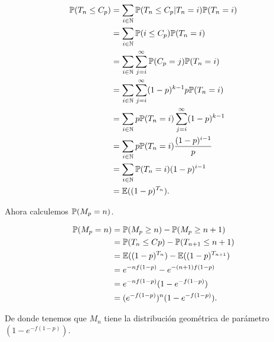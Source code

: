     \begin{align}
        \mathbb{P}(T_n \leq C_p)   &=  \sum_{i \in \mathbb{N}} \mathbb{P}(T_n \leq C_p | T_n = i) \mathbb{P}(T_n = i)        \\
                            &=  \sum_{i \in \mathbb{N}} \mathbb{P}(i \leq C_p) \mathbb{P}(T_n = i)                    \\
                            &=  \sum_{i \in \mathbb{N}} \sum_{j = i}^{\infty} \mathbb{P}(C_p = j) \mathbb{P}(T_n = i) \\
                            &=  \sum_{i \in \mathbb{N}} \sum_{j = i}^{\infty} (1-p)^{k-1} p\mathbb{P}(T_n = i) \\
                            &=  \sum_{i \in \mathbb{N}} p\mathbb{P}(T_n = i) \sum_{j = i}^{\infty} (1-p)^{k-1} \\                            
                            &=  \sum_{i \in \mathbb{N}} p\mathbb{P}(T_n = i) \frac{(1-p)^{i-1}}{p}             \\                            
                            &=  \sum_{i \in \mathbb{N}} \mathbb{P}(T_n = i) (1-p)^{i-1}                        \\                     
                            &=  \mathbb{E}((1-p)^{T_n}).                                                            
    \end{align}\par\null
    
    Ahora calculemos $\mathbb{P}(M_p = n)$.\par\null
    
    \begin{align}
        \mathbb{P}(M_p = n)    &=  \mathbb{P}(M_p \geq n) - \mathbb{P}(M_p \geq n + 1)       \\
                        &=  \mathbb{P}(T_n \leq Cp)- \mathbb{P}(T_{n+1} \leq n + 1)   \\
                        &=  \mathbb{E}((1-p)^{T_n}) - \mathbb{E}((1-p)^{T_{n+1}})       \\
                        &=  e^{-nf(1-p)}    - e^{-(n+1)f(1-p)}          \\
                        &=  e^{-nf(1-p)} (1- e^{-f(1-p)})               \\
                        &=  (e^{-f(1-p)})^n (1- e^{-f(1-p)}).           
    \end{align}\par\null
    
    De donde tenemos que $M_n$ tiene la distribución geométrica de parámetro $(1- e^{-f(1-p)})$.